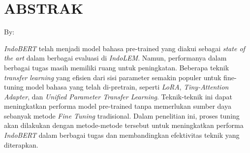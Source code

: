 \clearpage
\chapter*{ABSTRAK}

\begin{center}
    \center
    \begin{singlespace}
        \large\bfseries\MakeUppercase{\thetitle}
    
        \normalfont\normalsize
        By:
    
        \bfseries \theauthor
    \end{singlespace}
\end{center} 


\begin{singlespace}
    \textit{IndoBERT} telah menjadi model bahasa pre-trained yang diakui sebagai \textit{state of the art} dalam berbagai evaluasi di \textit{IndoLEM}.
    Namun, performanya dalam berbagai tugas masih memiliki ruang untuk peningkatan. 
    Beberapa teknik \textit{transfer learning} yang efisien dari sisi parameter semakin populer 
    untuk fine-tuning model bahasa yang telah di-pretrain, seperti \textit{LoRA}, \textit{Tiny-Attention Adapter}, dan \textit{Unified Parameter Transfer Learning}. 
    Teknik-teknik ini dapat meningkatkan performa model pre-trained tanpa memerlukan sumber daya sebanyak metode \textit{Fine Tuning} tradisional. 
    Dalam penelitian ini, proses tuning akan dilakukan dengan metode-metode tersebut untuk meningkatkan performa \textit{IndoBERT} dalam berbagai tugas dan membandingkan efektivitas teknik yang diterapkan.
\end{singlespace}
\clearpage

\clearpage